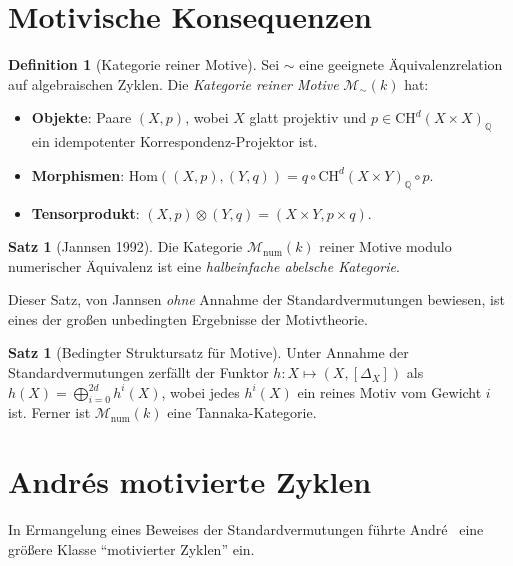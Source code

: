 \documentclass[12pt,a4paper]{amsart}
\theoremstyle{definition}
\newtheorem{satz}[theorem]{Satz}
\newtheorem{definition_de}[theorem]{Definition}
\newcommand{\Q}{\mathbb{Q}}
\newcommand{\Hom}{\mathrm{Hom}}
\newcommand{\CH}{\mathrm{CH}}
\begin{document}
\section{Motivische Konsequenzen}\label{sec:motive}

\begin{definition_de}[Kategorie reiner Motive]
Sei $\sim$ eine geeignete Äquivalenzrelation auf algebraischen Zyklen.
Die \emph{Kategorie reiner Motive} $\mathcal{M}_\sim(k)$ hat:
\begin{itemize}
  \item \textbf{Objekte}: Paare $(X, p)$, wobei $X$ glatt projektiv und
        $p \in \CH^d(X \times X)_\Q$ ein idempotenter Korrespondenz-Projektor ist.
  \item \textbf{Morphismen}: $\Hom((X,p),(Y,q)) = q \circ \CH^d(X \times Y)_\Q \circ p$.
  \item \textbf{Tensorprodukt}: $(X,p) \otimes (Y,q) = (X \times Y, p \times q)$.
\end{itemize}
\end{definition_de}

\begin{satz}[Jannsen 1992]\label{satz:jannsen}
Die Kategorie $\mathcal{M}_{\mathrm{num}}(k)$ reiner Motive modulo numerischer
Äquivalenz ist eine \emph{halbeinfache abelsche Kategorie}.
\end{satz}

Dieser Satz, von Jannsen \emph{ohne} Annahme der Standardvermutungen bewiesen,
ist eines der großen unbedingten Ergebnisse der Motivtheorie.

\begin{satz}[Bedingter Struktursatz für Motive]
Unter Annahme der Standardvermutungen zerfällt der Funktor
$h: X \mapsto (X, [\Delta_X])$ als
$h(X) = \bigoplus_{i=0}^{2d} h^i(X)$,
wobei jedes $h^i(X)$ ein reines Motiv vom Gewicht $i$ ist.
Ferner ist $\mathcal{M}_{\mathrm{num}}(k)$ eine Tannaka-Kategorie.
\end{satz}

\section{Andrés motivierte Zyklen}\label{sec:andre}

In Ermangelung eines Beweises der Standardvermutungen führte
Andr\'e~\cite{andre1996} eine größere Klasse ``motivierter Zyklen'' ein.
\end{document}
